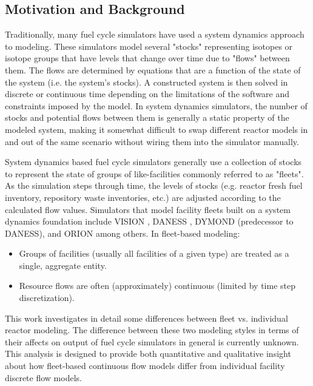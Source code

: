 \documentclass{style}
\begin{document}
\subsection{Motivation and Background}

Traditionally, many fuel cycle simulators have used a system dynamics approach
\cite{forrester_industrial_1961} to modeling. These simulators model several
"stocks" representing isotopes or isotope groups that have levels that change
over time due to "flows" between them.  The flows are determined by equations
that are a function of the state of the system (i.e. the system's stocks).  A
constructed system is then solved in discrete or continuous time depending on
the limitations of the software and constraints imposed by the model.  In
system dynamics simulators, the number of stocks and potential flows between
them is generally a static property of the modeled system, making it somewhat
difficult to swap different reactor models in and out of the same scenario
without wiring them into the simulator manually.

System dynamics based fuel cycle simulators generally use a collection of
stocks to represent the state of groups of like-facilities commonly referred
to as "fleets".  As the simulation steps through time, the levels of stocks
(e.g. reactor fresh fuel inventory, repository waste inventories, etc.) are
adjusted according to the calculated flow values.  Simulators that model
facility fleets built on a system dynamics foundation include VISION
\cite{jacobson_verifiable_2010}, DANESS \cite{van_den_durpel_daness_2009},
DYMOND (predecessor to DANESS), and ORION \cite{gregg_orion_2012} among
others.  In fleet-based modeling:

\begin{itemize}

    \item Groups of facilities (usually all facilities of a given type) are
        treated as a single, aggregate entity.

    \item Resource flows are often (approximately) continuous (limited by time
        step discretization).

\end{itemize}

This work investigates in detail some differences between fleet vs. individual
reactor modeling.  The difference between these two modeling styles in terms
of their affects on output of fuel cycle simulators in general is currently
unknown. This analysis is designed to provide both quantitative and
qualitative insight about how fleet-based continuous flow models differ from
individual facility discrete flow models.
\end{document}
